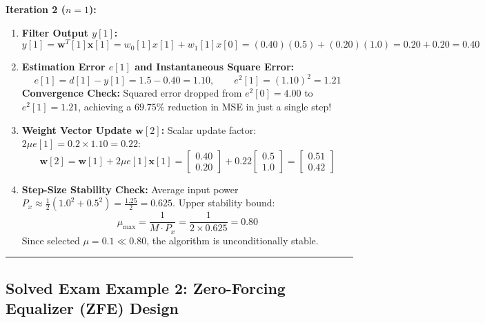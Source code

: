 \documentclass[11pt,a4paper]{article}
\begin{document}
\noindent\textbf{Iteration 2 ($n = 1$):}
\begin{enumerate}
    \item \textbf{Filter Output $y[1]$:}
    \begin{equation}
    y[1] = \mathbf{w}^T[1] \mathbf{x}[1] = w_0[1]x[1] + w_1[1]x[0] = (0.40)(0.5) + (0.20)(1.0) = 0.20 + 0.20 = \mathbf{0.40}
    \end{equation}
    \item \textbf{Estimation Error $e[1]$ and Instantaneous Square Error:}
    \begin{equation}
    e[1] = d[1] - y[1] = 1.5 - 0.40 = \mathbf{1.10}, \qquad e^2[1] = (1.10)^2 = \mathbf{1.21}
    \end{equation}
    \textbf{Convergence Check:} Squared error dropped from $e^2[0] = 4.00$ to $e^2[1] = 1.21$, achieving a $\mathbf{69.75\%}$ reduction in MSE in just a single step!
    \item \textbf{Weight Vector Update $\mathbf{w}[2]$:}
    Scalar update factor: $2\mu e[1] = 0.2 \times 1.10 = \mathbf{0.22}$:
    \begin{equation}
    \mathbf{w}[2] = \mathbf{w}[1] + 2\mu e[1] \mathbf{x}[1] = \begin{bmatrix} 0.40 \\ 0.20 \end{bmatrix} + 0.22 \begin{bmatrix} 0.5 \\ 1.0 \end{bmatrix} = \mathbf{\begin{bmatrix} 0.51 \\ 0.42 \end{bmatrix}}
    \end{equation}
    \item \textbf{Step-Size Stability Check:}
    Average input power $P_x \approx \frac{1}{2}(1.0^2 + 0.5^2) = \frac{1.25}{2} = 0.625$. Upper stability bound:
    \begin{equation}
    \mu_{\max} = \frac{1}{M \cdot P_x} = \frac{1}{2 \times 0.625} = \mathbf{0.80}
    \end{equation}
    Since selected $\mu = 0.1 \ll 0.80$, the algorithm is unconditionally stable.
\end{enumerate}

\noindent\rule{\textwidth}{0.5pt}

\subsection*{Solved Exam Example 2: Zero-Forcing Equalizer (ZFE) Design}
\end{document}
